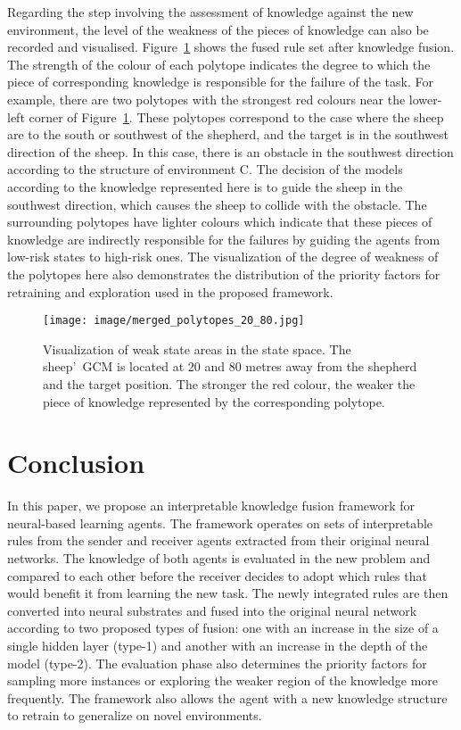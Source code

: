 \documentclass[lettersize,journal]{IEEEtran}
\begin{document}
Regarding the step involving the assessment of knowledge against the new environment, the level of the weakness of the pieces of knowledge can also be recorded and visualised. Figure~\ref{fig:weak_state_area} shows the fused rule set after knowledge fusion. The strength of the colour of each polytope indicates the degree to which the piece of corresponding knowledge is responsible for the failure of the task. For example, there are two polytopes with the strongest red colours near the lower-left corner of Figure~\ref{fig:weak_state_area}. These polytopes correspond to the case where the sheep are to the south or southwest of the shepherd, and the target is in the southwest direction of the sheep. In this case, there is an obstacle in the southwest direction according to the structure of environment C. The decision of the models according to the knowledge represented here is to guide the sheep in the southwest direction, which causes the sheep to collide with the obstacle. The surrounding polytopes have lighter colours which indicate that these pieces of knowledge are indirectly responsible for the failures by guiding the agents from low-risk states to high-risk ones. The visualization of the degree of weakness of the polytopes here also demonstrates the distribution of the priority factors for retraining and exploration used in the proposed framework.

\begin{figure}
    \centering
    \texttt{[image: image/merged\_polytopes\_20\_80.jpg]}
    \caption{Visualization of weak state areas in the state space. The sheep\textquoteright \ GCM is located at 20 and 80 metres away from the shepherd and the target position. The stronger the red colour, the weaker the piece of knowledge represented by the corresponding polytope.}
    \label{fig:weak_state_area}
\end{figure}


\section{Conclusion}\label{jpaper2-conclusion}

In this paper, we propose an interpretable knowledge fusion framework for neural-based learning agents. The framework operates on sets of interpretable rules from the sender and receiver agents extracted from their original neural networks. The knowledge of both agents is evaluated in the new problem and compared to each other before the receiver decides to adopt which rules that would benefit it from learning the new task. The newly integrated rules are then converted into neural substrates and fused into the original neural network according to two proposed types of fusion: one with an increase in the size of a single hidden layer (type-1) and another with an increase in the depth of the model (type-2). The evaluation phase also determines the priority factors for sampling more instances or exploring the weaker region of the knowledge more frequently. The framework also allows the agent with a new knowledge structure to retrain to generalize on novel environments.
\end{document}
